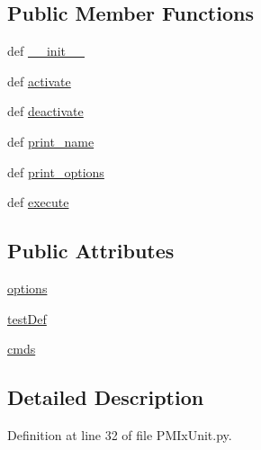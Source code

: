 \subsection*{Public Member Functions}
\begin{DoxyCompactItemize}
\item 
def \hyperlink{class_p_m_ix_unit_1_1_p_m_ix_unit_a01b0f667b854dc0d7051c071d01f2cdb}{\-\_\-\-\_\-init\-\_\-\-\_\-}
\item 
def \hyperlink{class_p_m_ix_unit_1_1_p_m_ix_unit_af9eb3845f804e5cff57f0b96a5c1d912}{activate}
\item 
def \hyperlink{class_p_m_ix_unit_1_1_p_m_ix_unit_a77590898cef9e5d560857e25a00ee287}{deactivate}
\item 
def \hyperlink{class_p_m_ix_unit_1_1_p_m_ix_unit_a64943a4530694aa835f021d0442fc8dd}{print\-\_\-name}
\item 
def \hyperlink{class_p_m_ix_unit_1_1_p_m_ix_unit_a716d70327c8f43718a74e99e87eb05e1}{print\-\_\-options}
\item 
def \hyperlink{class_p_m_ix_unit_1_1_p_m_ix_unit_a692047ba1b5639b1c02f25922cd014bb}{execute}
\end{DoxyCompactItemize}
\subsection*{Public Attributes}
\begin{DoxyCompactItemize}
\item 
\hyperlink{class_p_m_ix_unit_1_1_p_m_ix_unit_a6c56979e7226a414874653b3e7a17dd8}{options}
\item 
\hyperlink{class_p_m_ix_unit_1_1_p_m_ix_unit_a08b01eaf2867a0a02f8598018739e843}{test\-Def}
\item 
\hyperlink{class_p_m_ix_unit_1_1_p_m_ix_unit_a1130f07074aeff223235a147440868c4}{cmds}
\end{DoxyCompactItemize}


\subsection{Detailed Description}


Definition at line 32 of file P\-M\-Ix\-Unit.\-py.



